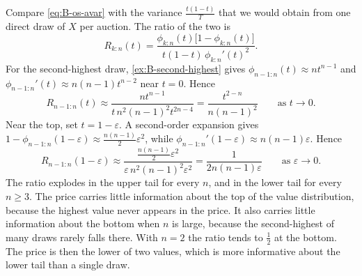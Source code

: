 \begin{remark}\label{rem:B-os-precision}
Compare \eqref{eq:B-os-avar} with the variance $\frac{t(1-t)}{T}$ that we would obtain from one direct draw
of $X$ per auction. The ratio of the two is
\begin{equation*}
  R_{k:n}(t) = \frac{\phi_{k:n}(t)\big[1 - \phi_{k:n}(t)\big]}{t(1-t)\,\phi_{k:n}'(t)^2}.
\end{equation*}
For the second-highest draw, \cref{ex:B-second-highest} gives $\phi_{n-1:n}(t) \approx nt^{n-1}$ and
$\phi_{n-1:n}'(t) \approx n(n-1)t^{n-2}$ near $t = 0$. Hence
\begin{equation*}
  R_{n-1:n}(t) \approx \frac{nt^{n-1}}{t\,n^2(n-1)^2t^{2n-4}} = \frac{t^{2-n}}{n(n-1)^2} \qquad
  \text{as } t \to 0.
\end{equation*}
Near the top, set $t = 1 - \varepsilon$. A second-order expansion gives $1 - \phi_{n-1:n}(1 - \varepsilon)
\approx \frac{n(n-1)}{2}\varepsilon^2$, while $\phi_{n-1:n}'(1 - \varepsilon) \approx n(n-1)\varepsilon$.
Hence
\begin{equation*}
  R_{n-1:n}(1 - \varepsilon) \approx \frac{\frac{n(n-1)}{2}\varepsilon^2}{\varepsilon\,n^2(n-1)^2
  \varepsilon^2} = \frac{1}{2n(n-1)\varepsilon} \qquad \text{as } \varepsilon \to 0.
\end{equation*}
The ratio explodes in the upper tail for every $n$, and in the lower tail for every $n \geq 3$. The price
carries little information about the top of the value distribution, because the highest value never
appears in the price. It also carries little information about the bottom when $n$ is large, because the
second-highest of many draws rarely falls there. With $n = 2$ the ratio tends to $\frac{1}{2}$ at the
bottom. The price is then the lower of two values, which is more informative about the lower tail than a
single draw.
\end{remark}

